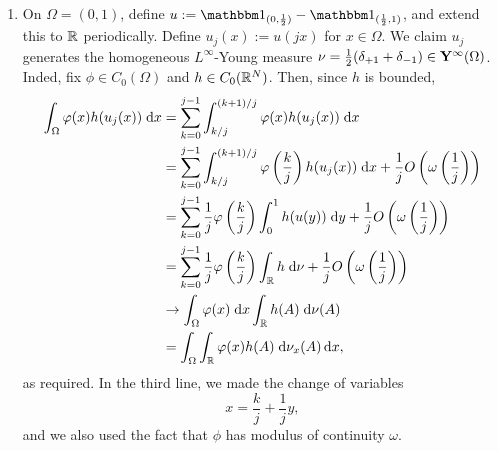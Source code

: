 \begin{example}
    \begin{enumerate}[label=(\arabic*)]
        \item On $\Omega = (0,1)$, define $u := \bbone_{(0,\frac{1}{2})} - \bbone_{(\frac{1}{2},1)}$, and extend this to $\mathbb{R}$ periodically. Define $u_j(x) := u(jx)$ for $x \in \Omega$. We claim $u_j$ generates the homogeneous $L^\infty$-Young measure $\nu = \frac{1}{2}(\delta_{+1} + \delta_{-1}) \in \mathbf{Y}^\infty(\Omega)$. Inded, fix $\phi \in C_0(\Omega)$ and $h \in C_0(\mathbb{R}^N)$. Then, since $h$ is bounded,
        \begin{equation} \begin{aligned}
            \int_\Omega \varphi(x) h(u_j(x)) \; \mathrm{d} x &= \sum_{k=0}^{j-1} \int_{k/j}^{(k+1)/j} \varphi(x) h(u_j(x)) \; \mathrm{d} x \\
                                                &= \sum_{k=0}^{j-1} \int_{k/j}^{(k+1)/j} \varphi\left( {\frac{k}{j}} \right) h(u_j(x)) \; \mathrm{d} x + \frac{1}{j} O\left( {\omega\left( {\frac{1}{j}} \right)} \right) \\
                                                &= \sum_{k=0}^{j-1} \frac{1}{j} \varphi\left( {\frac{k}{j}} \right) \int_0^1 h(u(y)) \; \mathrm{d} y + \frac{1}{j} O\left( {\omega\left( {\frac{1}{j}} \right)} \right) \\
                                                &= \sum_{k=0}^{j-1} \frac{1}{j} \varphi\left( {\frac{k}{j}} \right) \int_{\mathbb{R}} h \; \mathrm{d}\nu + \frac{1}{j} O\left( {\omega\left( {\frac{1}{j}} \right)} \right) \\
                                                &\to \int_\Omega \varphi(x) \; \mathrm{d} x \int_{\mathbb{R}} h(A) \; \mathrm{d}\nu(A) \\
                                                &= \int_\Omega \int_{\mathbb{R}} \varphi(x) h(A) \; \mathrm{d}\nu_x(A) \, \mathrm{d} x,
        \end{aligned} \end{equation}
        as required. In the third line, we made the change of variables 
        \begin{equation}
            x = \frac{k}{j} + \frac{1}{j}y,
        \end{equation}
        and we also used the fact that $\phi$ has modulus of continuity $\omega$.


\end{enumerate}
\end{example}
